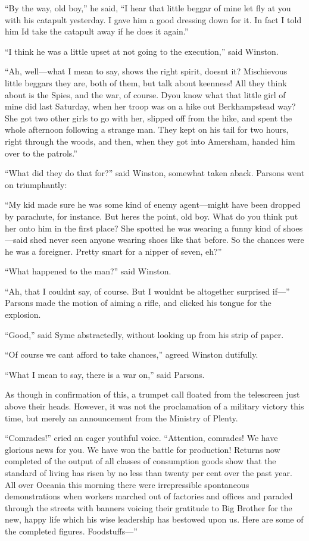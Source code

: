 ``By the way, old boy,'' he said, ``I hear that little beggar of mine let
fly at you with his catapult yesterday. I gave him a good dressing down
for it. In fact I told him I\textquotesingle d take the catapult away if
he does it again.''

``I think he was a little upset at not going to the execution,'' said
Winston.

``Ah, well---what I mean to say, shows the right spirit,
doesn\textquotesingle t it? Mischievous little beggars they are, both of
them, but talk about keenness! All they think about is the Spies, and
the war, of course. D\textquotesingle you know what that little girl of
mine did last Saturday, when her troop was on a hike out Berkhampstead
way? She got two other girls to go with her, slipped off from the hike,
and spent the whole afternoon following a strange man. They kept on his
tail for two hours, right through the woods, and then, when they got
into Amersham, handed him over to the patrols.''

``What did they do that for?'' said Winston, somewhat taken aback. Parsons
went on triumphantly:

``My kid made sure he was some kind of enemy agent---might have been
dropped by parachute, for instance. But here\textquotesingle s the
point, old boy. What do you think put her onto him in the first place?
She spotted he was wearing a funny kind of shoes---said
she\textquotesingle d never seen anyone wearing shoes like that before.
So the chances were he was a foreigner. Pretty smart for a nipper of
seven, eh?''

``What happened to the man?'' said Winston.

``Ah, that I couldn\textquotesingle t say, of course. But I
wouldn\textquotesingle t be altogether surprised if---'' Parsons made the
motion of aiming a rifle, and clicked his tongue for the explosion.

``Good,'' said Syme abstractedly, without looking up from his strip of
paper.

``Of course we can\textquotesingle t afford to take chances,'' agreed
Winston dutifully.

``What I mean to say, there is a war on,'' said Parsons.

As though in confirmation of this, a trumpet call floated from the
telescreen just above their heads. However, it was not the proclamation
of a military victory this time, but merely an announcement from the
Ministry of Plenty.

``Comrades!'' cried an eager youthful voice. ``Attention, comrades! We have
glorious news for you. We have won the battle for production! Returns
now completed of the output of all classes of consumption goods show
that the standard of living has risen by no less than twenty per cent
over the past year. All over Oceania this morning there were
irrepressible spontaneous demonstrations when workers marched out of
factories and offices and paraded through the streets with banners
voicing their gratitude to Big Brother for the new, happy life which his
wise leadership has bestowed upon us. Here are some of the completed
figures. Foodstuffs---''

